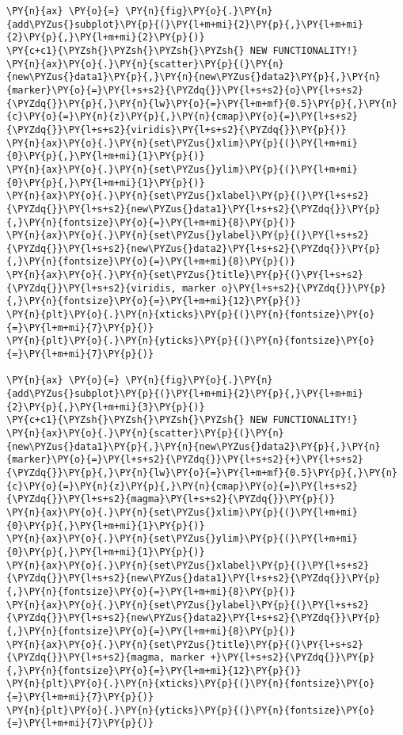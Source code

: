 \begin{tcolorbox}[breakable, size=fbox, boxrule=1pt, pad at break*=1mm,colback=cellbackground, colframe=cellborder]
\begin{Verbatim}[commandchars=\\\{\}]
\PY{n}{ax} \PY{o}{=} \PY{n}{fig}\PY{o}{.}\PY{n}{add\PYZus{}subplot}\PY{p}{(}\PY{l+m+mi}{2}\PY{p}{,}\PY{l+m+mi}{2}\PY{p}{,}\PY{l+m+mi}{2}\PY{p}{)}
\PY{c+c1}{\PYZsh{}\PYZsh{}\PYZsh{}\PYZsh{} NEW FUNCTIONALITY!}
\PY{n}{ax}\PY{o}{.}\PY{n}{scatter}\PY{p}{(}\PY{n}{new\PYZus{}data1}\PY{p}{,}\PY{n}{new\PYZus{}data2}\PY{p}{,}\PY{n}{marker}\PY{o}{=}\PY{l+s+s2}{\PYZdq{}}\PY{l+s+s2}{o}\PY{l+s+s2}{\PYZdq{}}\PY{p}{,}\PY{n}{lw}\PY{o}{=}\PY{l+m+mf}{0.5}\PY{p}{,}\PY{n}{c}\PY{o}{=}\PY{n}{z}\PY{p}{,}\PY{n}{cmap}\PY{o}{=}\PY{l+s+s2}{\PYZdq{}}\PY{l+s+s2}{viridis}\PY{l+s+s2}{\PYZdq{}}\PY{p}{)}
\PY{n}{ax}\PY{o}{.}\PY{n}{set\PYZus{}xlim}\PY{p}{(}\PY{l+m+mi}{0}\PY{p}{,}\PY{l+m+mi}{1}\PY{p}{)}
\PY{n}{ax}\PY{o}{.}\PY{n}{set\PYZus{}ylim}\PY{p}{(}\PY{l+m+mi}{0}\PY{p}{,}\PY{l+m+mi}{1}\PY{p}{)}
\PY{n}{ax}\PY{o}{.}\PY{n}{set\PYZus{}xlabel}\PY{p}{(}\PY{l+s+s2}{\PYZdq{}}\PY{l+s+s2}{new\PYZus{}data1}\PY{l+s+s2}{\PYZdq{}}\PY{p}{,}\PY{n}{fontsize}\PY{o}{=}\PY{l+m+mi}{8}\PY{p}{)}
\PY{n}{ax}\PY{o}{.}\PY{n}{set\PYZus{}ylabel}\PY{p}{(}\PY{l+s+s2}{\PYZdq{}}\PY{l+s+s2}{new\PYZus{}data2}\PY{l+s+s2}{\PYZdq{}}\PY{p}{,}\PY{n}{fontsize}\PY{o}{=}\PY{l+m+mi}{8}\PY{p}{)}
\PY{n}{ax}\PY{o}{.}\PY{n}{set\PYZus{}title}\PY{p}{(}\PY{l+s+s2}{\PYZdq{}}\PY{l+s+s2}{viridis, marker o}\PY{l+s+s2}{\PYZdq{}}\PY{p}{,}\PY{n}{fontsize}\PY{o}{=}\PY{l+m+mi}{12}\PY{p}{)}
\PY{n}{plt}\PY{o}{.}\PY{n}{xticks}\PY{p}{(}\PY{n}{fontsize}\PY{o}{=}\PY{l+m+mi}{7}\PY{p}{)}
\PY{n}{plt}\PY{o}{.}\PY{n}{yticks}\PY{p}{(}\PY{n}{fontsize}\PY{o}{=}\PY{l+m+mi}{7}\PY{p}{)}

\PY{n}{ax} \PY{o}{=} \PY{n}{fig}\PY{o}{.}\PY{n}{add\PYZus{}subplot}\PY{p}{(}\PY{l+m+mi}{2}\PY{p}{,}\PY{l+m+mi}{2}\PY{p}{,}\PY{l+m+mi}{3}\PY{p}{)}
\PY{c+c1}{\PYZsh{}\PYZsh{}\PYZsh{}\PYZsh{} NEW FUNCTIONALITY!}
\PY{n}{ax}\PY{o}{.}\PY{n}{scatter}\PY{p}{(}\PY{n}{new\PYZus{}data1}\PY{p}{,}\PY{n}{new\PYZus{}data2}\PY{p}{,}\PY{n}{marker}\PY{o}{=}\PY{l+s+s2}{\PYZdq{}}\PY{l+s+s2}{+}\PY{l+s+s2}{\PYZdq{}}\PY{p}{,}\PY{n}{lw}\PY{o}{=}\PY{l+m+mf}{0.5}\PY{p}{,}\PY{n}{c}\PY{o}{=}\PY{n}{z}\PY{p}{,}\PY{n}{cmap}\PY{o}{=}\PY{l+s+s2}{\PYZdq{}}\PY{l+s+s2}{magma}\PY{l+s+s2}{\PYZdq{}}\PY{p}{)}
\PY{n}{ax}\PY{o}{.}\PY{n}{set\PYZus{}xlim}\PY{p}{(}\PY{l+m+mi}{0}\PY{p}{,}\PY{l+m+mi}{1}\PY{p}{)}
\PY{n}{ax}\PY{o}{.}\PY{n}{set\PYZus{}ylim}\PY{p}{(}\PY{l+m+mi}{0}\PY{p}{,}\PY{l+m+mi}{1}\PY{p}{)}
\PY{n}{ax}\PY{o}{.}\PY{n}{set\PYZus{}xlabel}\PY{p}{(}\PY{l+s+s2}{\PYZdq{}}\PY{l+s+s2}{new\PYZus{}data1}\PY{l+s+s2}{\PYZdq{}}\PY{p}{,}\PY{n}{fontsize}\PY{o}{=}\PY{l+m+mi}{8}\PY{p}{)}
\PY{n}{ax}\PY{o}{.}\PY{n}{set\PYZus{}ylabel}\PY{p}{(}\PY{l+s+s2}{\PYZdq{}}\PY{l+s+s2}{new\PYZus{}data2}\PY{l+s+s2}{\PYZdq{}}\PY{p}{,}\PY{n}{fontsize}\PY{o}{=}\PY{l+m+mi}{8}\PY{p}{)}
\PY{n}{ax}\PY{o}{.}\PY{n}{set\PYZus{}title}\PY{p}{(}\PY{l+s+s2}{\PYZdq{}}\PY{l+s+s2}{magma, marker +}\PY{l+s+s2}{\PYZdq{}}\PY{p}{,}\PY{n}{fontsize}\PY{o}{=}\PY{l+m+mi}{12}\PY{p}{)}
\PY{n}{plt}\PY{o}{.}\PY{n}{xticks}\PY{p}{(}\PY{n}{fontsize}\PY{o}{=}\PY{l+m+mi}{7}\PY{p}{)}
\PY{n}{plt}\PY{o}{.}\PY{n}{yticks}\PY{p}{(}\PY{n}{fontsize}\PY{o}{=}\PY{l+m+mi}{7}\PY{p}{)}


\end{Verbatim}
\end{tcolorbox}
